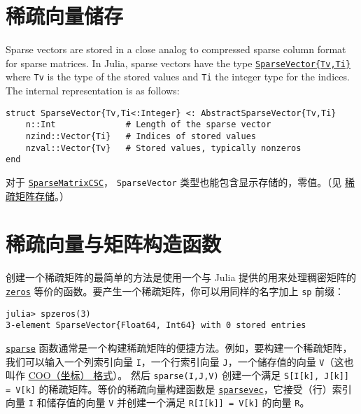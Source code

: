\hypertarget{6464897929371876878}{}


\section{稀疏向量储存}



Sparse vectors are stored in a close analog to compressed sparse column format for sparse matrices. In Julia, sparse vectors have the type \hyperlink{17594730109701296640}{\texttt{SparseVector\{Tv,Ti\}}} where \texttt{Tv} is the type of the stored values and \texttt{Ti} the integer type for the indices. The internal representation is as follows:




\begin{verbatim}
struct SparseVector{Tv,Ti<:Integer} <: AbstractSparseVector{Tv,Ti}
    n::Int              # Length of the sparse vector
    nzind::Vector{Ti}   # Indices of stored values
    nzval::Vector{Tv}   # Stored values, typically nonzeros
end
\end{verbatim}



对于 \hyperlink{15099699527958384292}{\texttt{SparseMatrixCSC}}， \texttt{SparseVector} 类型也能包含显示存储的，零值。（见 \hyperlink{4286524230912717228}{稀疏矩阵存储}。）



\hypertarget{2715559278970050628}{}


\section{稀疏向量与矩阵构造函数}



创建一个稀疏矩阵的最简单的方法是使用一个与 Julia 提供的用来处理稠密矩阵的\hyperlink{13837674686090348619}{\texttt{zeros}} 等价的函数。要产生一个稀疏矩阵，你可以用同样的名字加上 \texttt{sp} 前缀：




\begin{verbatim}
julia> spzeros(3)
3-element SparseVector{Float64, Int64} with 0 stored entries
\end{verbatim}



\hyperlink{10167157011990389788}{\texttt{sparse}} 函数通常是一个构建稀疏矩阵的便捷方法。例如，要构建一个稀疏矩阵，我们可以输入一个列索引向量 \texttt{I}，一个行索引向量 \texttt{J}，一个储存值的向量 \texttt{V}（这也叫作 \href{https://en.wikipedia.org/wiki/Sparse\_matrix\#Coordinate\_list\_.28COO.29}{COO（坐标） 格式}）。 然后 \texttt{sparse(I,J,V)} 创建一个满足 \texttt{S[I[k], J[k]] = V[k]} 的稀疏矩阵。等价的稀疏向量构建函数是 \hyperlink{13364181309585533450}{\texttt{sparsevec}}，它接受（行）索引向量 \texttt{I} 和储存值的向量 \texttt{V} 并创建一个满足 \texttt{R[I[k]] = V[k]} 的向量 \texttt{R}。




